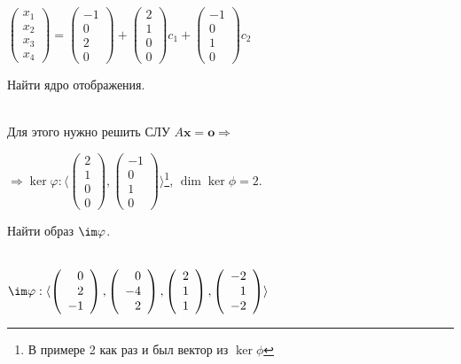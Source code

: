 $\left( \begin{array}{r}
    x_1\\
    x_2\\
    x_3\\
    x_4
\end{array}\right) = \left( \begin{array}{r}
    -1\\
    0\\
    2\\
    0
\end{array}\right) + \left( \begin{array}{r}
    2\\
    1\\
    0\\
    0
\end{array}\right) c_1 + \left( \begin{array}{r}
    -1\\
    0\\
    1\\
    0
\end{array}\right) c_2 $

\begin{prim}
Найти ядро отображения.
\end{prim}\\

Для этого нужно решить СЛУ $A\textbf{x}=\textbf{o} \Rightarrow$

$\Rightarrow\ker\varphi:\langle \left( \begin{array}{r} %
    2\\
    1\\
    0\\
    0
\end{array}\right), \left( \begin{array}{r}
    -1\\
    0\\
    1\\
    0
\end{array}\right)\rangle$\footnote{В примере 2 как раз и был вектор из $\ker\phi$}, \quad $\dim\ker\phi=2$.

\begin{prim}
Найти образ $\im\varphi$.
\end{prim}\\

$\im\varphi : \langle \left( \begin{array}{r}
    0\\
    2\\
    -1
\end{array}\right),\left( \begin{array}{r}
    0\\
    -4\\
    2
\end{array}\right),\left( \begin{array}{r}
    2\\
    1\\
    1
\end{array}\right),\left( \begin{array}{r}
    -2\\
    1\\
    -2
\end{array}\right) \rangle$

